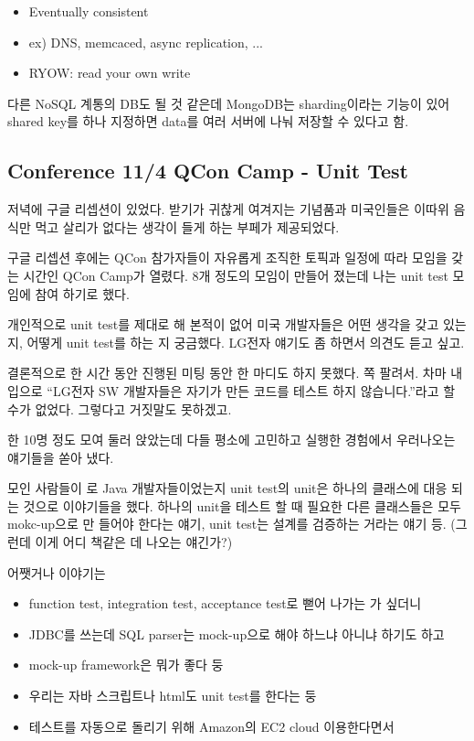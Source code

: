 \documentclass[a4paper]{article}
\begin{document}
\begin{itemize}
\item Eventually consistent
\item ex) DNS, memcaced, async replication, ...
\item RYOW: read your own write
\end{itemize}
 
다른 NoSQL 계통의 DB도 될 것 같은데 MongoDB는 sharding이라는 기능이
있어 shared key를 하나 지정하면 data를 여러 서버에 나눠 저장할 수
있다고 함.
 
\subsection{Conference 11/4 QCon Camp - Unit Test}
 
저녁에 구글 리셉션이 있었다. 받기가 귀찮게 여겨지는 기념품과 미국인들은
이따위 음식만 먹고 살리가 없다는 생각이 들게 하는 부페가 제공되었다.
 
구글 리셉션 후에는 QCon 참가자들이 자유롭게 조직한 토픽과 일정에 따라
모임을 갖는 시간인 QCon Camp가 열렸다. 8개 정도의 모임이 만들어 졌는데
나는 unit test 모임에 참여 하기로 했다.
 
개인적으로 unit test를 제대로 해 본적이 없어 미국 개발자들은 어떤
생각을 갖고 있는 지, 어떻게 unit test를 하는 지 궁금했다.
LG전자 얘기도 좀 하면서 의견도 듣고 싶고.
 
결론적으로 한 시간 동안 진행된 미팅 동안 한 마디도 하지 못했다. 쪽
팔려서. 차마 내 입으로 ``LG전자 SW 개발자들은 자기가 만든 코드를 테스트
하지 않습니다.''라고 할 수가 없었다. 그렇다고 거짓말도 못하겠고.
 
한 10명 정도 모여 둘러 앉았는데 다들 평소에 고민하고 실행한 경험에서
우러나오는 얘기들을 쏟아 냈다.
 
모인 사람들이 로 Java 개발자들이었는지 unit test의 unit은 하나의
클래스에 대응 되는 것으로 이야기들을 했다. 하나의 unit을 테스트 할 때
필요한 다른 클래스들은 모두 mokc-up으로 만 들어야 한다는 얘기, unit
test는 설계를 검증하는 거라는 얘기 등.
(그런데 이게 어디 책같은 데 나오는 얘긴가?)
 
어쨋거나 이야기는 
\begin{itemize}
\item function test, integration test, acceptance test로 뻗어 나가는 가 싶더니 
\item JDBC를 쓰는데 SQL parser는  mock-up으로 해야 하느냐 아니냐 하기도 하고 
\item mock-up framework은 뭐가 좋다 둥 
\item 우리는 자바 스크립트나 html도 unit test를 한다는 둥
\item 테스트를 자동으로 돌리기 위해 Amazon의 EC2 cloud 이용한다면서 
\end{itemize}
 
\end{document}
